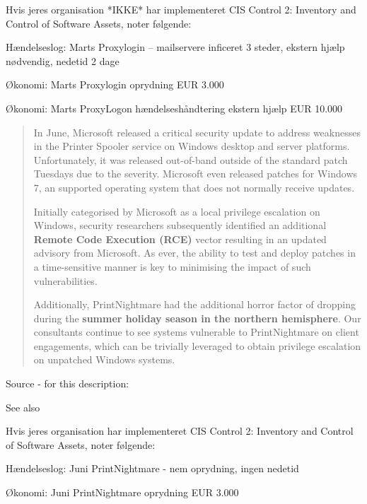 \documentclass[Screen16to9,17pt]{foils}
\begin{document}
Hvis jeres organisation *IKKE* har implementeret CIS Control 2: Inventory and Control of Software Assets, noter følgende:
\begin{list2}
\item Hændelseslog: Marts Proxylogin -- mailservere inficeret 3 steder, ekstern hjælp nødvendig, nedetid 2 dage
\item Økonomi: Marts Proxylogin oprydning EUR 3.000
\item Økonomi: Marts ProxyLogon hændelseshåndtering ekstern hjælp EUR 10.000
\end{list2}



\begin{quote} \small
In June, Microsoft released a critical security update to address weaknesses in the Printer Spooler service on Windows desktop and server platforms. Unfortunately, it was released out-of-band outside of the standard patch Tuesdays due to the severity. Microsoft even released patches for Windows 7, an supported operating system that does not normally receive updates.

Initially categorised by Microsoft as a local privilege escalation on Windows, security researchers subsequently identified an additional {\bf Remote Code Execution (RCE)} vector resulting in an updated advisory from Microsoft. As ever, the ability to test and deploy patches in a time-sensitive manner is key to minimising the impact of such vulnerabilities.

Additionally, PrintNightmare had the additional horror factor of dropping during the {\bf summer holiday season in the northern hemisphere}. Our consultants continue to see systems vulnerable to PrintNightmare on client engagements, which can be trivially leveraged to obtain privilege escalation on unpatched Windows systems.
\end{quote}

Source - for this description:\\

See also 



Hvis jeres organisation har implementeret CIS Control 2: Inventory and Control of Software Assets, noter følgende:
\begin{list2}
\item Hændelseslog: Juni PrintNightmare - nem oprydning, ingen nedetid
\item Økonomi: Juni PrintNightmare oprydning EUR 3.000
\end{list2}
\end{document}
